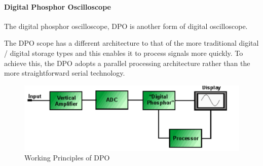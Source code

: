 \paragraph*{Digital Phosphor Oscilloscope}

	The digital phosphor oscilloscope, DPO is another form of digital oscilloscope.

	The DPO scope has a different architecture to that of the more traditional digital / digital storage types and this enables it to process signals more quickly. To achieve this, the DPO adopts a parallel processing architecture rather than the more straightforward serial technology.




\begin{figure}[H]
	\center
	\setlength{\unitlength}{\textwidth} 
	\includegraphics[width=1.0\unitlength]{dpo}
	\caption{\label{fig:dpo}Working Principles of DPO }
\end{figure}


